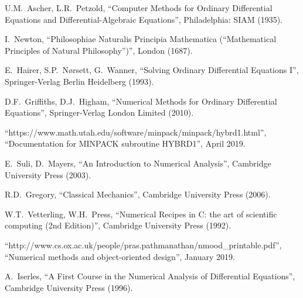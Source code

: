 \documentclass[12pt, twoside]{report}
\theoremstyle{plain}
\theoremstyle{definition}
\theoremstyle{definition}
\begin{document}
\begin{thebibliography}{50}
        U.M.~Ascher, L.R.~Petzold,
        ``Computer Methods for Ordinary Differential Equations and 
        Differential-Algebraic Equations'',
        Philadelphia: SIAM (1935).

        I.~Newton,
        ``Philosophiae Naturalis Principia Mathematica (“Mathematical
        Principles of Natural Philosophy”)'',
        London (1687).

        E.~Hairer, S.P.~N{\o}rsett, G.~Wanner,
        ``Solving Ordinary Differential Equations I'',
        Springer-Verlag Berlin Heidelberg (1993).

        D.F.~Griffiths, D.J.~Higham,
        ``Numerical Methods for Ordinary Differential Equations'',
        Springer-Verlag London Limited (2010).

        ``https://www.math.utah.edu/software/minpack/minpack/hybrd1.html'', 
        ``Documentation for MINPACK subroutine HYBRD1'',
        April 2019.

        E.~Suli, D.~Mayers,
        ``An Introduction to Numerical Analysis'',
        Cambridge University Press (2003).

        R.D.~Gregory,
        ``Classical Mechanics'',
        Cambridge University Press (2006).

        W.T.~Vetterling, W.H.~Press,
        ``Numerical Recipes in C: the art of scientific computing (2nd 
        Edition)'',
        Cambridge University Press (1992).

        ``http://www.cs.ox.ac.uk/people/pras.pathmanathan/nmood\_printable.pdf'',
        ``Numerical methods and object-oriented design'',
        January 2019.

        A.~Iserles,
        ``A First Course in the Numerical Analysis of Differential Equations'',
        Cambridge University Press (1996).

\end{thebibliography}
\end{document}
